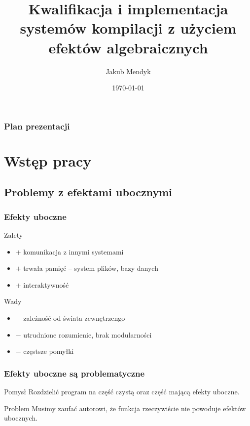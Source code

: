 \documentclass[polish, 13pt, usenames, dvipsnames]{beamer}
\title[Systemy kompilacji z użyciem efektów algebraicznych i uchwytów]{Kwalifikacja i implementacja systemów kompilacji z użyciem efektów algebraicznych}
\author{Jakub Mendyk}
\date{\today}
\institute[]{Instytut Informatyki Uniwersytetu Wrocławskiego}
\begin{document}
\begin{frame}
\titlepage
\end{frame}

\begin{frame}
\frametitle{Plan prezentacji}
\tableofcontents
\end{frame}

\section{Wstęp pracy}

\subsection{Problemy z efektami ubocznymi}

\newcommand\pro{\item[\textcolor{example text.fg}{$+$}]}
\newcommand\con{\item[\alert{$-$}]}

\begin{frame}
  \frametitle{Efekty uboczne}
  \begin{exampleblock}{Zalety}
    \begin{itemize}
      \pro komunikacja z innymi systemami
      \pro trwała pamięć -- system plików, bazy danych
      \pro interaktywność
    \end{itemize}
  \end{exampleblock}
  \begin{alertblock}{Wady}
    \begin{itemize}
      \con zależność od świata zewnętrzengo
      \con utrudnione rozumienie, brak modularności
      \con częstsze pomyłki
    \end{itemize}
  \end{alertblock}
\end{frame}

\begin{frame}
  \frametitle{Efekty uboczne są problematyczne}
  \begin{exampleblock}{Pomysł}
    Rozdzielić program na część czystą oraz część mającą efekty uboczne.
  \end{exampleblock}
  \pause
  \vspace{1em}
  \begin{alertblock}{Problem}
    Musimy zaufać autorowi, że funkcja rzeczywiście nie powoduje efektów ubocznych.
  \end{alertblock}
\end{frame}
\end{document}
